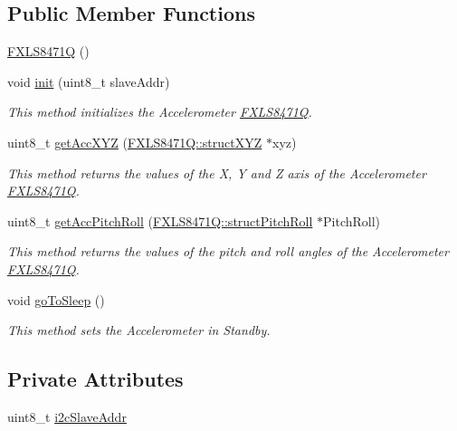 \subsection*{Public Member Functions}
\begin{DoxyCompactItemize}
\item 
\hyperlink{class_f_x_l_s8471_q_af6d170ebbacae88335d6c29224d5cc0c}{F\+X\+L\+S8471Q} ()
\item 
void \hyperlink{class_f_x_l_s8471_q_a65f1994bddb6bfae7d8a4e35b390a08d}{init} (uint8\+\_\+t slave\+Addr)
\begin{DoxyCompactList}\small\item\em This method initializes the Accelerometer \hyperlink{class_f_x_l_s8471_q}{F\+X\+L\+S8471Q}. \end{DoxyCompactList}\item 
uint8\+\_\+t \hyperlink{class_f_x_l_s8471_q_ae4b516a49ab351ef663b14231083a666}{get\+Acc\+X\+YZ} (\hyperlink{struct_f_x_l_s8471_q_1_1struct_x_y_z}{F\+X\+L\+S8471\+Q\+::struct\+X\+YZ} $\ast$xyz)
\begin{DoxyCompactList}\small\item\em This method returns the values of the X, Y and Z axis of the Accelerometer \hyperlink{class_f_x_l_s8471_q}{F\+X\+L\+S8471Q}. \end{DoxyCompactList}\item 
uint8\+\_\+t \hyperlink{class_f_x_l_s8471_q_ae94d465acb1d7044365d5364c5ab8686}{get\+Acc\+Pitch\+Roll} (\hyperlink{struct_f_x_l_s8471_q_1_1struct_pitch_roll}{F\+X\+L\+S8471\+Q\+::struct\+Pitch\+Roll} $\ast$Pitch\+Roll)
\begin{DoxyCompactList}\small\item\em This method returns the values of the pitch and roll angles of the Accelerometer \hyperlink{class_f_x_l_s8471_q}{F\+X\+L\+S8471Q}. \end{DoxyCompactList}\item 
void \hyperlink{class_f_x_l_s8471_q_afb8a176addd8b73d1df028831d7bf8b8}{go\+To\+Sleep} ()
\begin{DoxyCompactList}\small\item\em This method sets the Accelerometer in Standby. \end{DoxyCompactList}\end{DoxyCompactItemize}
\subsection*{Private Attributes}
\begin{DoxyCompactItemize}
\item 
uint8\+\_\+t \hyperlink{class_f_x_l_s8471_q_a4e1d91629c057575a8aecc5ec63b6237}{i2c\+Slave\+Addr}
\end{DoxyCompactItemize}


